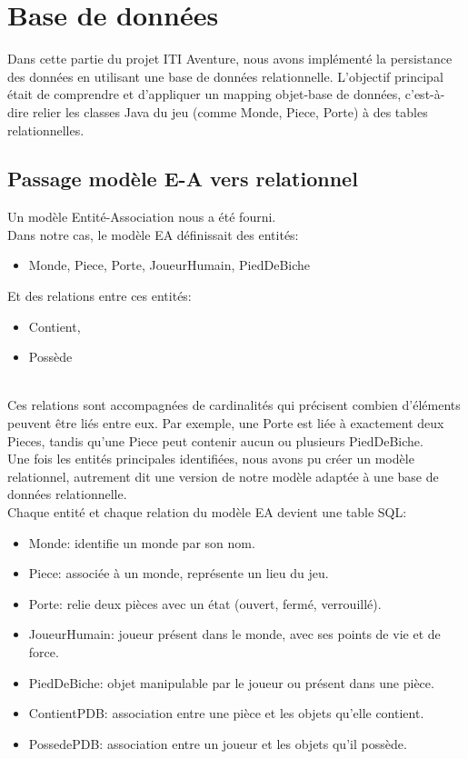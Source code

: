 \chapter{Base de données}

Dans cette partie du projet ITI Aventure, nous avons implémenté la persistance des données en utilisant une base de données relationnelle. L'objectif principal était de comprendre et d'appliquer un mapping objet-base de données, c’est-à-dire relier les classes Java du jeu (comme Monde, Piece, Porte) à des tables relationnelles.

\section{Passage modèle E-A vers relationnel}

Un modèle Entité-Association nous a été fourni.\\

Dans notre cas, le modèle EA définissait des entités:
\begin{itemize}
	\item Monde, Piece, Porte, JoueurHumain, PiedDeBiche
\end{itemize}

Et des relations entre ces entités:
\begin{itemize}
	\item Contient,
	\item Possède
\end{itemize}\\

Ces relations sont accompagnées de cardinalités qui précisent combien d'éléments peuvent être liés entre eux. Par exemple, une Porte est liée à exactement deux Pieces, tandis qu'une Piece peut contenir aucun ou plusieurs PiedDeBiche.\\

Une fois les entités principales identifiées, nous avons pu créer un modèle relationnel, autrement dit une version de notre modèle adaptée à une base de données relationnelle.\\

Chaque entité et chaque relation du modèle EA devient une table SQL:
\begin{itemize}
	\item Monde: identifie un monde par son nom.
	\item Piece: associée à un monde, représente un lieu du jeu.
	\item Porte: relie deux pièces avec un état (ouvert, fermé, verrouillé).
	\item JoueurHumain: joueur présent dans le monde, avec ses points de vie et de force.
	\item PiedDeBiche: objet manipulable par le joueur ou présent dans une pièce.
	\item ContientPDB: association entre une pièce et les objets qu’elle contient.
	\item PossedePDB: association entre un joueur et les objets qu’il possède.
\end{itemize}\\

